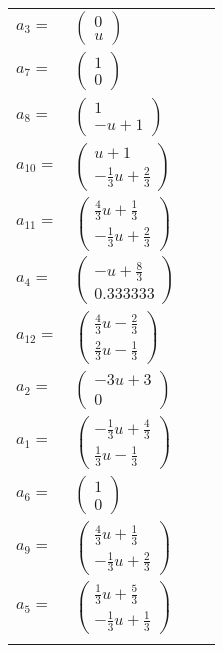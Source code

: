 \documentclass[1p]{elsarticle_modified}
\theoremstyle{definition}
\begin{document}
\begin{tabular}{m{7pt} m{180pt} m{7pt} m{180pt} }
\flushright $a_{3}=$&$\begin{pmatrix}0\\u\end{pmatrix}$ \\
\flushright $a_{7}=$&$\begin{pmatrix}1\\0\end{pmatrix}$ \\
\flushright $a_{8}=$&$\begin{pmatrix}1\\- u+1\end{pmatrix}$ \\
\flushright $a_{10}=$&$\begin{pmatrix}u+1\\-\frac{1}{3} u+\frac{2}{3}\end{pmatrix}$ \\
\flushright $a_{11}=$&$\begin{pmatrix}\frac{4}{3} u+\frac{1}{3}\\-\frac{1}{3} u+\frac{2}{3}\end{pmatrix}$ \\
\flushright $a_{4}=$&$\begin{pmatrix}- u+\frac{8}{3}\\0.333333\end{pmatrix}$ \\
\flushright $a_{12}=$&$\begin{pmatrix}\frac{4}{3} u-\frac{2}{3}\\\frac{2}{3} u-\frac{1}{3}\end{pmatrix}$ \\
\flushright $a_{2}=$&$\begin{pmatrix}-3 u+3\\0\end{pmatrix}$ \\
\flushright $a_{1}=$&$\begin{pmatrix}-\frac{1}{3} u+\frac{4}{3}\\\frac{1}{3} u-\frac{1}{3}\end{pmatrix}$ \\
\flushright $a_{6}=$&$\begin{pmatrix}1\\0\end{pmatrix}$ \\
\flushright $a_{9}=$&$\begin{pmatrix}\frac{4}{3} u+\frac{1}{3}\\-\frac{1}{3} u+\frac{2}{3}\end{pmatrix}$ \\
\flushright $a_{5}=$&$\begin{pmatrix}\frac{1}{3} u+\frac{5}{3}\\-\frac{1}{3} u+\frac{1}{3}\end{pmatrix}$\\&\end{tabular}
\end{document}

